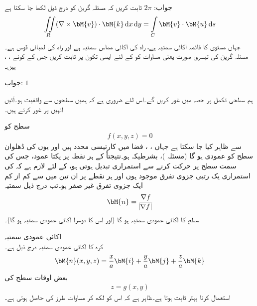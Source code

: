 جواب:\quad
$2\pi$
ثابت کریں کہ مسئلہ گرین کو درج ذیل لکھا جا سکتا ہے
\begin{align}\label{مساوات_خطی_تکمل_مسئلہ_گرین_تیسری_صورت}
\iint\limits_R (\nabla \times \bM{v}) \cdot \bM{k}\dif x\dif y=\int\limits_C \bM{v}\cdot \bM{u}\dif s
\end{align}
جہاں  مستوی  کا قائمہ اکائی سمتیہ ہے،  راہ  کی اکائی مماس سمتیہ ہے اور  راہ  کی لمبائی قوس ہے۔
مسئلہ گرین کی تیسری صورت یعنی مساوات  کو  کے لئے ایسی تکون پر ثابت کریں جس کے کونے ، ،  ہیں۔

جواب:\quad
$1$

ہم سطحی تکمل پر حصہ  میں غور کریں گے۔اس لئے ضروری ہے کہ ہمیں سطحوں سے واقفیت ہو۔آئیں انہیں پر غور کرتے ہیں۔

سطح  کو 
\begin{align}\label{مساوات_خطی_تکمل_سطح_خفی_روپ}
f(x,y,z)=0
\end{align}
سے ظاہر کیا جا سکتا ہے جہاں ، ،  فضا میں کارتیسی محدد ہیں اور یوں  کی ڈھلوان سطح  کو عمودی ہو گا (مسئلہ )، بشرطیکہ  ہو۔نتیجتاً  کے ہر نقطہ پر یکتا عمود، جس کی سمت سطح پر حرکت کرنے سے استمراری تبدیل ہوتی ہو، کے لئے لازم ہے کہ  کی استمراری یک رتبی جزوی تفرق موجود ہوں اور ہر نقطے پر ان تین میں سے کم از کم ایک جزوی تفرق غیر صفر ہو۔تب درج ذیل سمتیہ
\begin{align}
\bM{n}=\frac{\nabla f}{\abs{\nabla f}}
\end{align}
سطح  کا اکائی عمودی سمتیہ ہو گا (اور  اس کا دوسرا اکائی عمودی سمتیہ ہو گا)۔

\quad اکائی عمودی سمتیہ\\
کرہ  کا اکائی عمودی سمتیہ درج ذیل ہے۔
\begin{align*}
\bM{n}(x,y,z)=\frac{x}{a}\bM{i}+\frac{y}{a}\bM{j}+\frac{z}{a}\bM{k}
\end{align*}
بعض اوقات سطح کی 
\begin{align}\label{مساوات_خطی_تکمل_سطح_صریح_روپ}
z=g(x,y)
\end{align}
استعمال کرنا بہتر ثابت ہوتا ہے۔ظاہر ہے کہ اس کو  لکھ کر  مساوات  طرز  کی  حاصل ہوتی ہے۔

